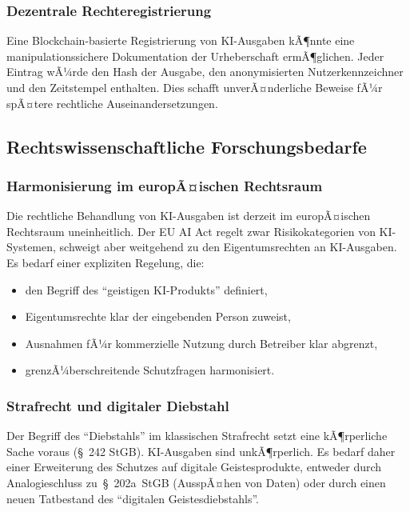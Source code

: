 ﻿\documentclass[a4paper,12pt]{article}
\theoremstyle{definition}
\begin{document}
\subsubsection{Dezentrale Rechteregistrierung}

Eine Blockchain-basierte Registrierung von KI-Ausgaben kÃ¶nnte eine manipulationssichere
Dokumentation der Urheberschaft ermÃ¶glichen. Jeder Eintrag wÃ¼rde den Hash der Ausgabe,
den anonymisierten Nutzerkennzeichner und den Zeitstempel enthalten. Dies schafft
unverÃ¤nderliche Beweise fÃ¼r spÃ¤tere rechtliche Auseinandersetzungen.

\subsection{Rechtswissenschaftliche Forschungsbedarfe}

\subsubsection{Harmonisierung im europÃ¤ischen Rechtsraum}

Die rechtliche Behandlung von KI-Ausgaben ist derzeit im europÃ¤ischen Rechtsraum
uneinheitlich. Der EU AI Act \cite{euaiact2024} regelt zwar Risikokategorien von
KI-Systemen, schweigt aber weitgehend zu den Eigentumsrechten an KI-Ausgaben. Es bedarf
einer expliziten Regelung, die:
\begin{itemize}
    \item den Begriff des ``geistigen KI-Produkts'' definiert,
    \item Eigentumsrechte klar der eingebenden Person zuweist,
    \item Ausnahmen fÃ¼r kommerzielle Nutzung durch Betreiber klar abgrenzt,
    \item grenzÃ¼berschreitende Schutzfragen harmonisiert.
\end{itemize}

\subsubsection{Strafrecht und digitaler Diebstahl}

Der Begriff des ``Diebstahls'' im klassischen Strafrecht setzt eine kÃ¶rperliche Sache
voraus (\S{}~242 StGB). KI-Ausgaben sind unkÃ¶rperlich. Es bedarf daher einer Erweiterung
des Schutzes auf digitale Geistesprodukte, entweder durch Analogieschluss zu~\S{}~202a~StGB
(AusspÃ¤hen von Daten) oder durch einen neuen Tatbestand des ``digitalen Geistesdiebstahls''.
\end{document}

